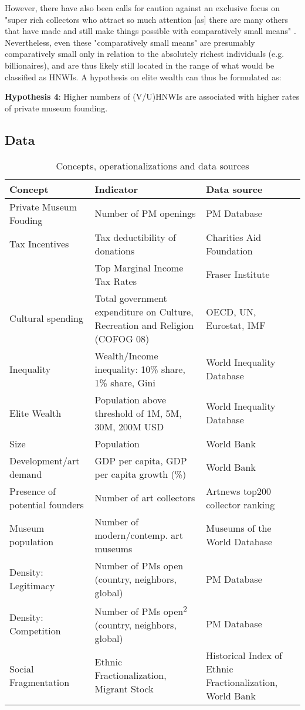 \documentclass[11pt, authoryear]{elsarticle}
\begin{document}
However, there have also been calls for caution against an exclusive focus on "super rich collectors who attract so much attention [as] there are many others that have made and still make things possible with comparatively small means" \citep[p.12]{Bechtler_Imhof_2018_future}.
Nevertheless, even these "comparatively small means" are presumably comparatively small only in relation to the absolutely richest individuals (e.g. billionaires), and are thus likely still located in the range of what would be classified as HNWIs.
A hypothesis on elite wealth can thus be formulated as: 

\bigbreak
\noindent
\textbf{Hypothesis 4}: Higher numbers of (V/U)HNWIs are associated with higher rates of private museum founding.




\subsection*{Data}


\begin{table}[htbp]
\caption{\label{tbl:data_srcs}Concepts, operationalizations and data sources}
\centering
\begin{tabular}{lp{7cm}p{5cm}}
\hline
Concept & Indicator & Data source\\
\hline
Private Museum Fouding & Number of PM openings & PM Database\\
Tax Incentives & Tax deductibility of donations & Charities Aid Foundation\\
 & Top Marginal Income Tax Rates & Fraser Institute\\
Cultural spending & Total government expenditure on Culture, Recreation and Religion (COFOG 08) & OECD, UN, Eurostat, IMF\\
Inequality & Wealth/Income inequality: 10\% share, 1\% share, Gini & World Inequality Database\\
Elite Wealth & Population above threshold of 1M, 5M, 30M, 200M USD & World Inequality Database\\
Size & Population & World Bank\\
Development/art demand & GDP per capita, GDP per capita growth (\%) & World Bank\\
Presence of potential founders & Number of art collectors & Artnews top200 collector ranking\\
Museum population & Number of modern/contemp. art museums & Museums of the World Database\\
Density: Legitimacy & Number of PMs open (country, neighbors, global) & PM Database\\
Density: Competition & Number of PMs open\textsuperscript{2} (country, neighbors, global) & PM Database\\
Social Fragmentation & Ethnic Fractionalization, Migrant Stock & Historical Index of Ethnic Fractionalization, World Bank\\
\hline
\end{tabular}
\end{table}
\end{document}
